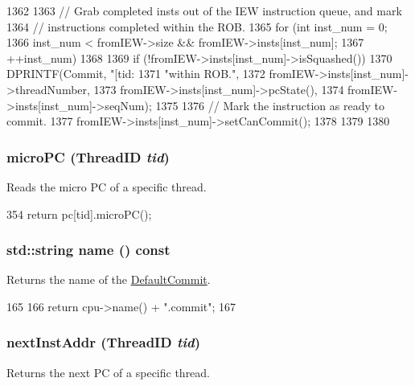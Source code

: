 \begin{DoxyCode}
1362 {
1363     // Grab completed insts out of the IEW instruction queue, and mark
1364     // instructions completed within the ROB.
1365     for (int inst_num = 0;
1366          inst_num < fromIEW->size && fromIEW->insts[inst_num];
1367          ++inst_num)
1368     {
1369         if (!fromIEW->insts[inst_num]->isSquashed()) {
1370             DPRINTF(Commit, "[tid:%
1371                     "within ROB.\n",
1372                     fromIEW->insts[inst_num]->threadNumber,
1373                     fromIEW->insts[inst_num]->pcState(),
1374                     fromIEW->insts[inst_num]->seqNum);
1375 
1376             // Mark the instruction as ready to commit.
1377             fromIEW->insts[inst_num]->setCanCommit();
1378         }
1379     }
1380 }
\end{DoxyCode}
\hypertarget{classDefaultCommit_a697667536e687bd20e95084adc90d820}{
\subsubsection[{microPC}]{ microPC ({\bf ThreadID} {\em tid})}}
\label{classDefaultCommit_a697667536e687bd20e95084adc90d820}
Reads the micro PC of a specific thread. 


\begin{DoxyCode}
354 { return pc[tid].microPC(); }
\end{DoxyCode}
\hypertarget{classDefaultCommit_a37627d5d5bba7f4a8690c71c2ab3cb07}{
\subsubsection[{name}]{\setlength{\rightskip}{0pt plus 5cm}std::string name () const}}
\label{classDefaultCommit_a37627d5d5bba7f4a8690c71c2ab3cb07}
Returns the name of the \hyperlink{classDefaultCommit}{DefaultCommit}. 


\begin{DoxyCode}
165 {
166     return cpu->name() + ".commit";
167 }
\end{DoxyCode}
\hypertarget{classDefaultCommit_af1caba1f04cf2802d742d1a16b961e79}{
\subsubsection[{nextInstAddr}]{ nextInstAddr ({\bf ThreadID} {\em tid})}}
\label{classDefaultCommit_af1caba1f04cf2802d742d1a16b961e79}
Returns the next PC of a specific thread. 


